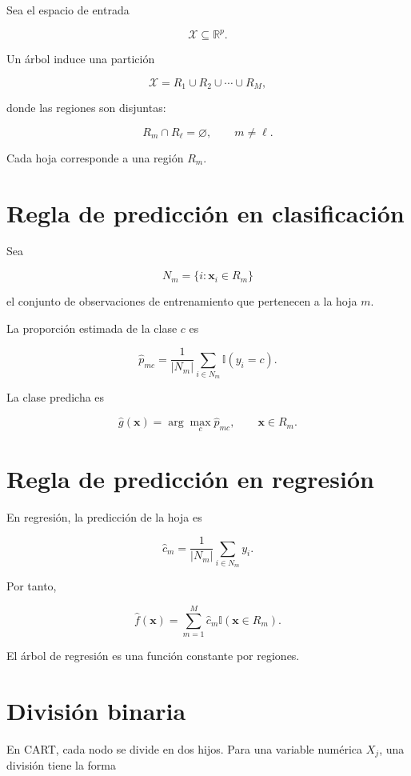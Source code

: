 \documentclass[
  spanish,
  11pt,
  letterpaper,
  DIV=11,
  numbers=noendperiod]{scrreprt}
\theoremstyle{definition}
\theoremstyle{plain}
\theoremstyle{definition}
\theoremstyle{remark}
\begin{document}
Sea el espacio de entrada

\[
\mathcal{X}\subseteq\mathbb{R}^p.
\]

Un árbol induce una partición

\[
\mathcal{X}
=
R_1\cup R_2\cup\cdots\cup R_M,
\]

donde las regiones son disjuntas:

\[
R_m\cap R_\ell=\varnothing,
\qquad m\neq \ell.
\]

Cada hoja corresponde a una región \(R_m\).

\section{Regla de predicción en
clasificación}\label{regla-de-predicciuxf3n-en-clasificaciuxf3n}

Sea

\[
N_m
=
\{i:\mathbf{x}_i\in R_m\}
\]

el conjunto de observaciones de entrenamiento que pertenecen a la hoja
\(m\).

La proporción estimada de la clase \(c\) es

\[
\widehat{p}_{mc}
=
\frac{1}{|N_m|}
\sum_{i\in N_m}
\mathbb{I}(y_i=c).
\]

La clase predicha es

\[
\widehat{g}(\mathbf{x})
=
\arg\max_c \widehat{p}_{mc},
\qquad
\mathbf{x}\in R_m.
\]

\section{Regla de predicción en
regresión}\label{regla-de-predicciuxf3n-en-regresiuxf3n}

En regresión, la predicción de la hoja es

\[
\widehat{c}_m
=
\frac{1}{|N_m|}
\sum_{i\in N_m}y_i.
\]

Por tanto,

\[
\widehat{f}(\mathbf{x})
=
\sum_{m=1}^{M}
\widehat{c}_m
\mathbb{I}(\mathbf{x}\in R_m).
\]

El árbol de regresión es una función constante por regiones.

\section{División binaria}\label{divisiuxf3n-binaria}

En CART, cada nodo se divide en dos hijos. Para una variable numérica
\(X_j\), una división tiene la forma
\end{document}
